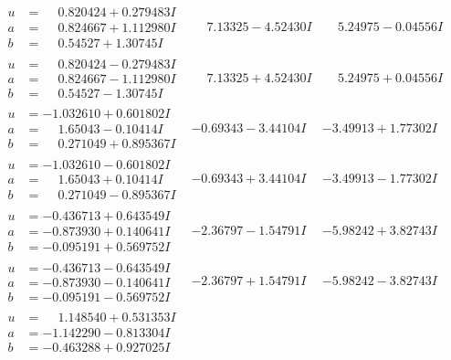 \documentclass[1p]{elsarticle_modified}
\theoremstyle{definition}
\begin{document}
$$\begin{array}{c|c|c}
\begin{aligned}
u &= \phantom{-}0.820424 + 0.279483 I \\
a &= \phantom{-}0.824667 + 1.112980 I \\
b &= \phantom{-}0.54527 + 1.30745 I\end{aligned}
 & \phantom{-}7.13325 - 4.52430 I & \phantom{-}5.24975 - 0.04556 I \\ \hline\begin{aligned}
u &= \phantom{-}0.820424 - 0.279483 I \\
a &= \phantom{-}0.824667 - 1.112980 I \\
b &= \phantom{-}0.54527 - 1.30745 I\end{aligned}
 & \phantom{-}7.13325 + 4.52430 I & \phantom{-}5.24975 + 0.04556 I \\ \hline\begin{aligned}
u &= -1.032610 + 0.601802 I \\
a &= \phantom{-}1.65043 - 0.10414 I \\
b &= \phantom{-}0.271049 + 0.895367 I\end{aligned}
 & -0.69343 - 3.44104 I & -3.49913 + 1.77302 I \\ \hline\begin{aligned}
u &= -1.032610 - 0.601802 I \\
a &= \phantom{-}1.65043 + 0.10414 I \\
b &= \phantom{-}0.271049 - 0.895367 I\end{aligned}
 & -0.69343 + 3.44104 I & -3.49913 - 1.77302 I \\ \hline\begin{aligned}
u &= -0.436713 + 0.643549 I \\
a &= -0.873930 + 0.140641 I \\
b &= -0.095191 + 0.569752 I\end{aligned}
 & -2.36797 - 1.54791 I & -5.98242 + 3.82743 I \\ \hline\begin{aligned}
u &= -0.436713 - 0.643549 I \\
a &= -0.873930 - 0.140641 I \\
b &= -0.095191 - 0.569752 I\end{aligned}
 & -2.36797 + 1.54791 I & -5.98242 - 3.82743 I \\ \hline\begin{aligned}
u &= \phantom{-}1.148540 + 0.531353 I \\
a &= -1.142290 - 0.813304 I \\
b &= -0.463288 + 0.927025 I\end{aligned}

\end{array}$$
\end{document}
